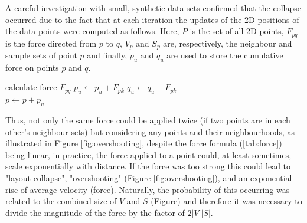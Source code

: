 \documentclass{l4proj}
\begin{document}
A careful investigation with small, synthetic data sets confirmed that 
the collapse occurred due to the fact that at each iteration the updates of the 2D positions of the data points were computed as follows. Here, $P$ is the set of all 2D points, $F_{pq}$ is the force directed from $p$ to $q$, $V_{p}$ and $S_{p}$ are, respectively, the neighbour and sample sets of point $p$ and finally, $p_{u}$ and $q_{u}$ are used to store the cumulative force on points $p$ and $q$.

\begin{algorithmic}
        \STATE calculate force $F_{pq}$
        \STATE $p_{u} \gets p_{u} + F_{pk}$
        \STATE $q_{u} \gets q_{u} - F_{pk}$
    \ENDFOR
\ENDFOR
\\
    \STATE $p \gets p + p_{u}$
\ENDFOR

\end{algorithmic}

Thus, not only the same force could be applied twice (if two points are in each other's neighbour sets) but considering any points and their neighbourhoods, as illustrated in Figure \ref{fig:overshooting}, despite the force formula (\ref{tab:force}) being linear, in practice, the force applied to a point could, at least sometimes, scale exponentially with distance. If the force was too strong this could lead to "layout collapse", "overshooting" (Figure \ref{fig:overshooting}), and an exponential rise of average velocity (force). Naturally, the probability of this occurring was related to the combined size of $V$ and $S$ (Figure) and therefore it was necessary to divide the magnitude of the force by the factor of $2|V||S|$. 
\end{document}
